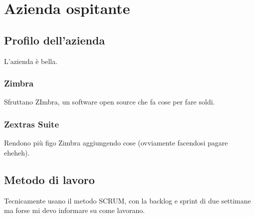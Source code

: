 \chapter{Azienda ospitante}

\section{Profilo dell'azienda}
L'azienda è bella.

\subsection{Zimbra}
Sfruttano ZImbra, un software open source che fa cose per fare soldi.

\subsection{Zextras Suite}
Rendono più figo Zimbra aggiungendo cose (ovviamente facendosi pagare eheheh).

\section{Metodo di lavoro}
Tecnicamente usano il metodo SCRUM, con la backlog e sprint di due settimane ma forse mi devo informare su come lavorano. \\



